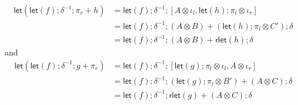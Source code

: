\documentclass[acmsmall,screen,review]{acmart}
\newcounter{todos}
\newcommand{\todo}[1]{\stepcounter{todos} \textcolor{red}{\textbf{TODO \arabic{todos}}: #1}}
\newcommand{\ms}[1]{\ensuremath{\mathsf{#1}}}
\newcommand{\lmor}[1]{\ms{let}(#1)}
\newcommand{\rlmor}[1]{\ms{rlet}(#1)}
\begin{document}
\begin{lemma}
\begin{enumerate}[label=(\alph*)]
\begin{equation}
\begin{aligned}
      \lmor{\lmor{f} ; \delta^{-1} ; \pi_r + h}
      &= \lmor{f} ; \delta^{-1} 
        ; [A \otimes \iota_l, \lmor{h} ; \pi_l \otimes \iota_r] \\
      &= \lmor{f} ; \delta^{-1} 
        ; (A \otimes B) + (\lmor{h} ; \pi_l \otimes C')
        ; \delta\\
      &= \lmor{f} ; \delta^{-1} 
        ; (A \otimes B) + \rlmor{h}
        ; \delta
      \end{aligned}
    \end{equation}
    and
    \begin{equation}
      \begin{aligned}
      \lmor{\lmor{f} ; \delta^{-1} ; g + \pi_r}
      &= \lmor{f} ; \delta^{-1} 
        ; [\lmor{g} ; \pi_l \otimes \iota_l, A \otimes \iota_r] \\
      &= \lmor{f} ; \delta^{-1} 
        ; (\lmor{g} ; \pi_l \otimes B') + (A \otimes C)
        ; \delta \\
      &= \lmor{f} ; \delta^{-1} 
        ; \rlmor{g} + (A \otimes C)
        ; \delta
      \end{aligned}
    \end{equation}
  \end{enumerate}
\end{lemma}

\end{document}

